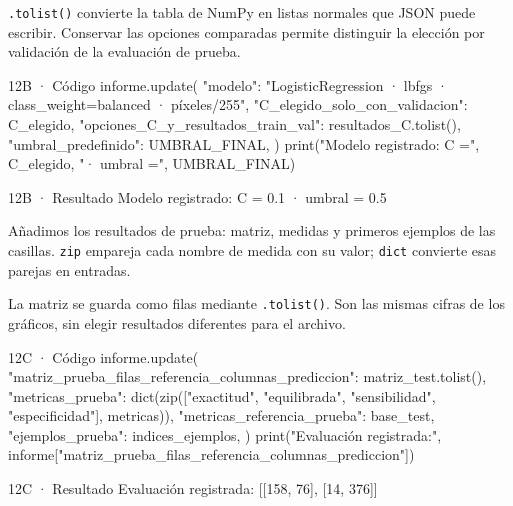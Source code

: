 \texttt{\small .\allowbreak{}tolist(\allowbreak{})\allowbreak{}} convierte la tabla de NumPy en listas normales que JSON puede escribir. Conservar las opciones comparadas permite distinguir la elección por validación de la evaluación de prueba.


\begin{Codigo}{12B · Código}
informe.update({
    "modelo": "LogisticRegression · lbfgs · class_weight=balanced · píxeles/255",
    "C_elegido_solo_con_validacion": C_elegido,
    "opciones_C_y_resultados_train_val": resultados_C.tolist(),
    "umbral_predefinido": UMBRAL_FINAL,
})
print("Modelo registrado: C =", C_elegido, "· umbral =", UMBRAL_FINAL)
\end{Codigo}

\begin{Salida}{12B · Resultado}
Modelo registrado: C = 0.1 · umbral = 0.5
\end{Salida}

\label{paso-12c}

Añadimos los resultados de prueba: matriz, medidas y primeros ejemplos de las casillas. \texttt{\small zip} empareja cada nombre de medida con su valor; \texttt{\small dict} convierte esas parejas en entradas.

La matriz se guarda como filas mediante \texttt{\small .\allowbreak{}tolist(\allowbreak{})\allowbreak{}}. Son las mismas cifras de los gráficos, sin elegir resultados diferentes para el archivo.


\begin{Codigo}{12C · Código}
informe.update({
    "matriz_prueba_filas_referencia_columnas_prediccion": matriz_test.tolist(),
    "metricas_prueba": dict(zip(["exactitud", "equilibrada", "sensibilidad", "especificidad"], metricas)),
    "metricas_referencia_prueba": base_test,
    "ejemplos_prueba": indices_ejemplos,
})
print("Evaluación registrada:", informe["matriz_prueba_filas_referencia_columnas_prediccion"])
\end{Codigo}

\begin{Salida}{12C · Resultado}
Evaluación registrada: [[158, 76], [14, 376]]
\end{Salida}

\label{paso-12d}

